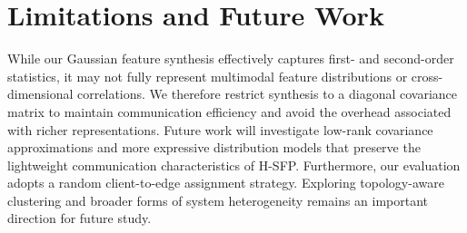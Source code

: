 \section{Limitations and Future Work}
\label{sec:limitations}
While our Gaussian feature synthesis effectively captures first- and second-order statistics, it may not fully represent multimodal feature distributions or cross-dimensional correlations. We therefore restrict synthesis to a diagonal covariance matrix to maintain communication efficiency and avoid the overhead associated with richer representations. Future work will investigate low-rank covariance approximations and more expressive distribution models that preserve the lightweight communication characteristics of H-SFP. Furthermore, our evaluation adopts a random client-to-edge assignment strategy. Exploring topology-aware clustering and broader forms of system heterogeneity remains an important direction for future study.